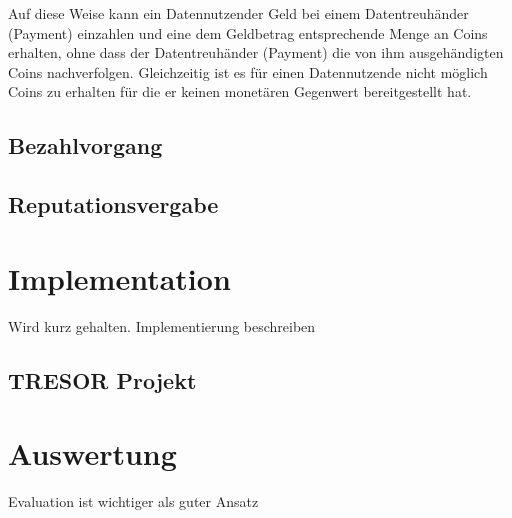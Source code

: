 \documentclass[11pt,a4paper]{scrreprt}
\begin{document}
Auf diese Weise kann ein Datennutzender Geld bei einem Datentreuhänder (Payment) einzahlen und eine dem Geldbetrag entsprechende Menge an Coins erhalten, ohne dass der Datentreuhänder (Payment) die von ihm ausgehändigten Coins nachverfolgen. Gleichzeitig ist es für einen Datennutzende nicht möglich Coins zu erhalten für die er keinen monetären Gegenwert bereitgestellt hat.

\section{Bezahlvorgang}

\section{Reputationsvergabe}










\chapter{Implementation}
Wird kurz gehalten. Implementierung beschreiben

\section{TRESOR Projekt}


\chapter{Auswertung}
Evaluation ist wichtiger als guter Ansatz
\end{document}
